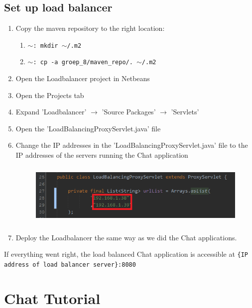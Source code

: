 \documentclass[11pt]{article}
\begin{document}
\subsection{Set up load balancer}
\begin{enumerate}
	\item Copy the maven repository to the right location:
	\begin{enumerate}
		\item \texttt{$\sim$: mkdir $\sim$/.m2}
		\item \texttt{$\sim$: cp -a groep\_8/maven\_repo/. $\sim$/.m2 }
	\end{enumerate}
	\item Open the Loadbalancer project in Netbeans
	\item Open the Projects tab
	\item Expand 'Loadbalancer' $\rightarrow$ 'Source Packages' $\rightarrow$ 'Servlets'
	\item Open the 'LoadBalancingProxyServlet.java' file
	\item Change the IP addresses in the 'LoadBalancingProxyServlet.java' file to the IP addresses of the servers running the Chat application
	\begin{figure}[H]
		\centering
		\includegraphics[height=30mm]{set_server_ip_addresses.png}
	\end{figure}
	\item Deploy the Loadbalancer the same way as we did the Chat applications.
\end{enumerate}
If everything went right, the load balanced Chat application is accessible at \texttt{\{IP address of load balancer server\}:8080}

\section{Chat Tutorial}
\end{document}

